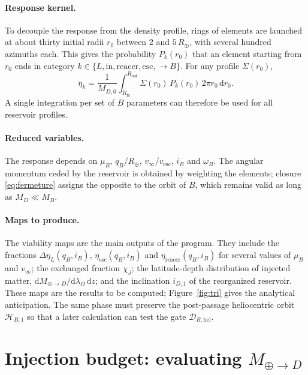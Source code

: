 \documentclass[11pt,a4paper,openany]{report}
\newcommand{\Rt}{R_{\oplus}}
\newcommand{\dd}{\mathrm{d}}
\begin{document}
\paragraph{Response kernel.}
To decouple the response from the density profile, rings of elements are launched at about thirty
initial radii $r_0$ between $2$ and $5\,\Rt$, with several hundred azimuths each. This gives the
probability $P_k(r_0)$ that an element starting from $r_0$ ends in category
$k\in\{L,\mathrm{in},\mathrm{reaccr},\mathrm{esc},\to B\}$. For any profile $\Sigma(r_0)$,
\begin{equation}
\eta_k=\frac{1}{M_{D,0}}\int_{R_{\mathrm{in}}}^{R_{\mathrm{out}}}\Sigma(r_0)\,P_k(r_0)\,2\pi r_0\,\dd r_0.
\label{eq:noyau}
\end{equation}
A single integration per set of $B$ parameters can therefore be used for all reservoir profiles.

\paragraph{Reduced variables.}
The response depends on $\mu_B$, $q_B/\Rt$, $v_\infty/v_{\mathrm{esc}}$, $i_B$ and $\omega_B$. The
angular momentum ceded by the reservoir is obtained by weighting the elements; closure
\eqref{eq:fermeture} assigns the opposite to the orbit of $B$, which remains valid as long as
$M_D\ll M_B$.

\paragraph{Maps to produce.}
The viability maps are the main outputs of the program. They include the fractions
$\Delta\eta_L(q_B,i_B)$, $\eta_{\mathrm{esc}}(q_B,i_B)$ and $\eta_{\mathrm{reaccr}}(q_B,i_B)$ for
several values of $\mu_B$ and $v_\infty$; the exchanged fraction $\chi_J$; the latitude-depth
distribution of injected matter, $\dd M_{\oplus\to D}/\dd\lambda_\Omega\,\dd z$; and the
inclination $i_{D,1}$ of the reorganized reservoir. These maps are the results to be computed;
Figure~\ref{fig:tri} gives the analytical anticipation.
The same phase must preserve the post-passage heliocentric orbit $\mathcal{H}_{B,1}$ so that a
later calculation can test the gate $\mathcal{D}_{B,\mathrm{hel}}$.

\section{Injection budget: evaluating \texorpdfstring{$M_{\oplus\to D}$}{M_Earth-to-D}}
\label{sec:bilan-injection}
\end{document}
